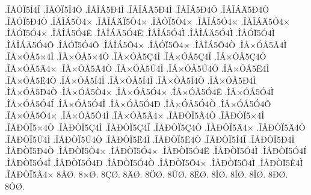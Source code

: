 {.^^ce^^c5^^d3^^cf5^^cd4^^ce
.^^ce^^c5^^d3^^cf5^^ce4^^d2
.^^ce^^c5^^ce^^c15^^d04^^cc
.^^ce^^c5^^ce^^c1^^c45^^d04^^cc
.^^ce^^c5^^ce^^c15^^d04^^d2
.^^ce^^c5^^ce^^c1^^c45^^d04^^d2
.^^ce^^c5^^d3^^cf5^^d04^^d2
.^^ce^^c5^^ce^^c15^^d24^^d7
.^^ce^^c5^^ce^^c1^^c4^^cf5^^d24^^d7
.^^ce^^c5^^d3^^cf5^^d24^^d7
.^^ce^^c5^^ce^^c15^^d34^^d7
.^^ce^^c5^^ce^^c1^^c45^^d34^^d7
.^^ce^^c5^^d3^^cf5^^d34^^d7
.^^ce^^c5^^ce^^c15^^d34^^cb
.^^ce^^c5^^ce^^c1^^c45^^d34^^cb
.^^ce^^c5^^ce^^c15^^d34^^cc
.^^ce^^c5^^ce^^c1^^c45^^d34^^cc
.^^ce^^c5^^d3^^cf5^^d34^^cc
.^^ce^^c5^^ce^^c1^^c45^^d34^^d4
.^^ce^^c5^^d3^^cf5^^d34^^d4
.^^ce^^c5^^ce^^c15^^d44^^d7
.^^ce^^c5^^d3^^cf5^^d44^^d7
.^^ce^^c5^^ce^^c15^^d44^^d2
.^^ce^^c5^^d7^^d3^^c55^^c24^^cc
.^^ce^^c5^^d7^^d3^^c55^^d74^^cc
.^^ce^^c5^^d7^^d3^^c55^^d74^^d2
.^^ce^^c5^^d7^^d3^^c55^^c74^^cc
.^^ce^^c5^^d7^^d3^^c55^^c74^^ce
.^^ce^^c5^^d7^^d3^^c55^^c74^^d2
.^^ce^^c5^^d7^^d3^^c55^^c44^^d7
.^^ce^^c5^^d7^^d3^^c55^^c44^^d2
.^^ce^^c5^^d7^^d3^^c55^^da4^^cc
.^^ce^^c5^^d7^^d3^^c55^^da4^^d2
.^^ce^^c5^^d7^^d3^^c55^^cb4^^cc
.^^ce^^c5^^d7^^d3^^c55^^cb4^^d2
.^^ce^^c5^^d7^^d3^^c55^^cd4^^cc
.^^ce^^c5^^d7^^d3^^c55^^cd4^^ce
.^^ce^^c5^^d7^^d3^^c55^^cd4^^d2
.^^ce^^c5^^d7^^d3^^c55^^d04^^cc
.^^ce^^c5^^d7^^d3^^c55^^d04^^d2
.^^ce^^c5^^d7^^d3^^c55^^d24^^d7
.^^ce^^c5^^d7^^d3^^c55^^d34^^d7
.^^ce^^c5^^d7^^d3^^c55^^d34^^cb
.^^ce^^c5^^d7^^d3^^c55^^d34^^cc
.^^ce^^c5^^d7^^d3^^c55^^d34^^cd
.^^ce^^c5^^d7^^d3^^c55^^d34^^ce
.^^ce^^c5^^d7^^d3^^c55^^d34^^d0
.^^ce^^c5^^d7^^d3^^c55^^d34^^d2
.^^ce^^c5^^d7^^d3^^c55^^d34^^d4
.^^ce^^c5^^d7^^d3^^c55^^d44^^d7
.^^ce^^c5^^d7^^d3^^c55^^d44^^cc
.^^ce^^c5^^d7^^d3^^c55^^c34^^d7
.^^ce^^c5^^d0^^d2^^cf5^^c24^^d2
.^^ce^^c5^^d0^^d2^^cf5^^d74^^cc
.^^ce^^c5^^d0^^d2^^cf5^^d74^^d2
.^^ce^^c5^^d0^^d2^^cf5^^c74^^cc
.^^ce^^c5^^d0^^d2^^cf5^^c74^^ce
.^^ce^^c5^^d0^^d2^^cf5^^c74^^d2
.^^ce^^c5^^d0^^d2^^cf5^^c44^^d7
.^^ce^^c5^^d0^^d2^^cf5^^c44^^d2
.^^ce^^c5^^d0^^d2^^cf5^^da4^^cc
.^^ce^^c5^^d0^^d2^^cf5^^da4^^d2
.^^ce^^c5^^d0^^d2^^cf5^^cb4^^cc
.^^ce^^c5^^d0^^d2^^cf5^^cb4^^d2
.^^ce^^c5^^d0^^d2^^cf5^^cd4^^ce
.^^ce^^c5^^d0^^d2^^cf5^^d04^^cc
.^^ce^^c5^^d0^^d2^^cf5^^d04^^d2
.^^ce^^c5^^d0^^d2^^cf5^^d24^^d7
.^^ce^^c5^^d0^^d2^^cf5^^d34^^d7
.^^ce^^c5^^d0^^d2^^cf5^^d34^^cb
.^^ce^^c5^^d0^^d2^^cf5^^d34^^cc
.^^ce^^c5^^d0^^d2^^cf5^^d34^^cd
.^^ce^^c5^^d0^^d2^^cf5^^d34^^ce
.^^ce^^c5^^d0^^d2^^cf5^^d34^^d0
.^^ce^^c5^^d0^^d2^^cf5^^d34^^d2
.^^ce^^c5^^d0^^d2^^cf5^^d44^^d7
.^^ce^^c5^^d0^^d2^^cf5^^d44^^cc
.^^ce^^c5^^d0^^d2^^cf5^^c84^^cc
.^^ce^^c5^^d0^^d2^^cf5^^c34^^d7
8^^c2^^d8.
8^^d7^^d8.
8^^c7^^d8.
8^^c4^^d8.
8^^d6^^d8.
8^^da^^d8.
8^^cb^^d8.
8^^cc^^d8.
8^^cd^^d8.
8^^ce^^d8.
8^^d0^^d8.
8^^d2^^d8.
}
